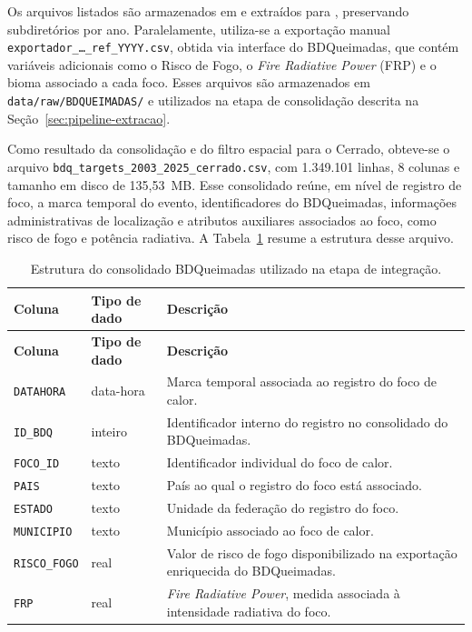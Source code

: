Os arquivos listados são armazenados em  e extraídos para , preservando subdiretórios por ano. Paralelamente, utiliza-se a exportação manual \texttt{exportador\_\ldots\_ref\_YYYY.csv}, obtida via interface do BDQueimadas, que contém variáveis adicionais como o Risco de Fogo, o \textit{Fire Radiative Power} (FRP) e o bioma associado a cada foco. Esses arquivos são armazenados em \texttt{data/raw/BDQUEIMADAS/} e utilizados na etapa de consolidação descrita na Seção~\ref{sec:pipeline-extracao}.

Como resultado da consolidação e do filtro espacial para o Cerrado, obteve-se o arquivo \texttt{bdq\_targets\_2003\_2025\_cerrado.csv}, com 1.349.101 linhas, 8 colunas e tamanho em disco de 135,53~MB. Esse consolidado reúne, em nível de registro de foco, a marca temporal do evento, identificadores do BDQueimadas, informações administrativas de localização e atributos auxiliares associados ao foco, como risco de fogo e potência radiativa. A Tabela~\ref{tab:bdq-colunas} resume a estrutura desse arquivo.
\begin{longtable}{p{3.4cm}p{2.2cm}p{8.0cm}}
\caption{Estrutura do consolidado BDQueimadas utilizado na etapa de integração.}
\label{tab:bdq-colunas}\\
\hline
\textbf{Coluna} & \textbf{Tipo de dado} & \textbf{Descrição} \\
\hline
\endfirsthead

\hline
\textbf{Coluna} & \textbf{Tipo de dado} & \textbf{Descrição} \\
\hline
\endhead

\hline
\endfoot

\texttt{DATAHORA} & data-hora & Marca temporal associada ao registro do foco de calor. \\
\texttt{ID\_BDQ} & inteiro & Identificador interno do registro no consolidado do BDQueimadas. \\
\texttt{FOCO\_ID} & texto & Identificador individual do foco de calor. \\
\texttt{PAIS} & texto & País ao qual o registro do foco está associado. \\
\texttt{ESTADO} & texto & Unidade da federação do registro do foco. \\
\texttt{MUNICIPIO} & texto & Município associado ao foco de calor. \\
\texttt{RISCO\_FOGO} & real & Valor de risco de fogo disponibilizado na exportação enriquecida do BDQueimadas. \\
\texttt{FRP} & real & \textit{Fire Radiative Power}, medida associada à intensidade radiativa do foco. \\
\end{longtable}

